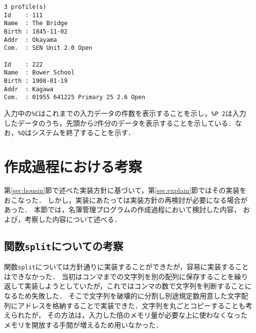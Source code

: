 \documentclass[a4j,11pt]{jarticle}
\begin{document}
{\fontsize{10pt}{11pt} \selectfont
 \begin{verbatim}
3 profile(s)
Id    : 111
Name  : The Bridge
Birth : 1845-11-02
Addr  : Okayama
Com.  : SEN Unit 2.0 Open

Id    : 222
Name  : Bower School
Birth : 1908-01-19
Addr  : Kagawa
Com.  : 01955 641225 Primary 25 2.6 Open

 \end{verbatim}
}

\noindent
入力中の\verb|%C|はこれまでの入力データの件数を表示することを示し，\verb|%P 2|は入力したデータのうち，先頭から2件分のデータを表示することを示している．なお，\verb|%Q|はシステムを終了することを示す．

\section{作成過程における考察}


第\ref{sec:housin}節で述べた実装方針に基づいて，第\ref{sec:explain}節ではその実装をおこなった．
しかし，実装にあたっては実装方針の再検討が必要になる場合があった．
本節では，名簿管理プログラムの作成過程において検討した内容，
および，考察した内容について述べる．

\subsection{関数\texttt{split}についての考察}

関数\verb|split|については方針通りに実装することができたが，容易に実装することはできなかった．
当初はコンマまでの文字列を別の配列に保存することを繰り返して実装しようとしていたが，これではコンマの数で文字列を判断することになるため失敗した．
そこで文字列を破壊的に分割し別途規定数用意した文字配列にアドレスを格納することで実装できた．文字列を丸ごとコピーすることも考えられたが，
その方法は，入力した倍のメモリ量が必要な上に使わなくなったメモリを開放する手間が増えるため用いなかった．
\end{document}
